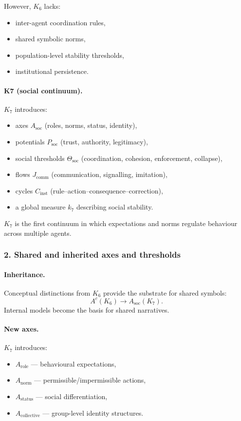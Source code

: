 However, $K_6$ lacks:
\begin{itemize}
  \item inter-agent coordination rules,
  \item shared symbolic norms,
  \item population-level stability thresholds,
  \item institutional persistence.
\end{itemize}

\paragraph{K7 (social continuum).}
$K_7$ introduces:
\begin{itemize}
  \item axes $A_{\mathrm{soc}}$ (roles, norms, status, identity),
  \item potentials $P_{\mathrm{soc}}$ (trust, authority, legitimacy),
  \item social thresholds $\Theta_{\mathrm{soc}}$ (coordination, cohesion,
        enforcement, collapse),
  \item flows $J_{\mathrm{comm}}$ (communication, signalling, imitation),
  \item cycles $C_{\mathrm{inst}}$ (rule–action–consequence–correction),
  \item a global measure $k_7$ describing social stability.
\end{itemize}

$K_7$ is the first continuum in which expectations and norms regulate
behaviour across multiple agents.

\subsubsection{2. Shared and inherited axes and thresholds}

\paragraph{Inheritance.}
Conceptual distinctions from $K_6$ provide the substrate for shared symbols:
\[
A^{c}(K_6) \rightarrow A_{\mathrm{soc}}(K_7).
\]
Internal models become the basis for shared narratives.

\paragraph{New axes.}
$K_7$ introduces:
\begin{itemize}
  \item $A_{\mathrm{role}}$ — behavioural expectations,
  \item $A_{\mathrm{norm}}$ — permissible/impermissible actions,
  \item $A_{\mathrm{status}}$ — social differentiation,
  \item $A_{\mathrm{collective}}$ — group-level identity structures.
\end{itemize}

